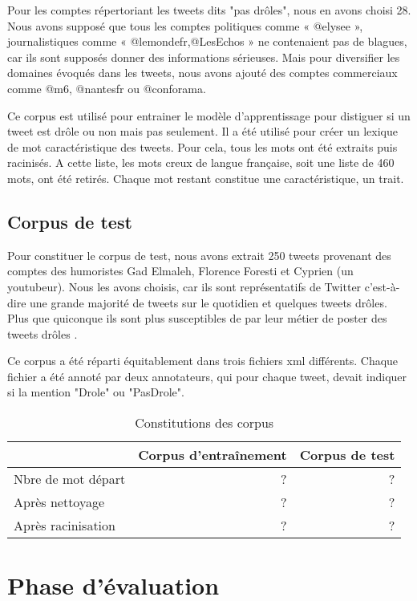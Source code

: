 \documentclass[10pt,a4paper,twoside]{article}
\begin{document}
Pour les comptes répertoriant les tweets dits "pas drôles", nous en avons choisi 28. Nous avons supposé que tous les comptes politiques comme « @elysee », journalistiques comme « @lemondefr,@LesEchos » ne contenaient pas de blagues, car ils sont supposés donner des informations sérieuses. Mais pour diversifier les domaines évoqués dans les tweets, nous avons ajouté des comptes commerciaux comme @m6, @nantesfr ou @conforama.

Ce corpus est utilisé pour entrainer le modèle d'apprentissage pour distiguer si un tweet est drôle ou non mais pas seulement. Il a été utilisé pour créer un lexique de mot caractéristique des tweets. Pour cela, tous les mots ont été extraits puis racinisés. A cette liste, les mots creux de langue française, soit une liste de 460 mots, ont été retirés. Chaque mot restant constitue une caractéristique, un trait.



\subsection{Corpus de test} 
Pour constituer le corpus de test, nous avons extrait 250 tweets provenant des comptes des humoristes Gad Elmaleh, Florence Foresti et Cyprien (un youtubeur). Nous les avons choisis, car ils sont représentatifs de Twitter c'est-à-dire une grande majorité de tweets sur le quotidien et quelques tweets drôles. Plus que quiconque ils sont plus susceptibles de par leur métier de poster des tweets drôles .

Ce corpus a été réparti équitablement dans trois fichiers xml différents. Chaque fichier a été annoté par deux annotateurs, qui pour chaque tweet, devait indiquer si la mention "Drole" ou "PasDrole".



\begin{table}[!h]
\centering
	\begin{tabular}{lrr}
	\toprule
	& Corpus d'entraînement & Corpus de test \\
	\midrule
	 Nbre de mot départ & ? & ? \\
	 Après nettoyage & ? & ? \\
	 Après racinisation & ? & ? \\
	\bottomrule
	\end{tabular}
\caption{Constitutions des corpus}
\end{table}


\section{Phase d'évaluation}
\end{document}
